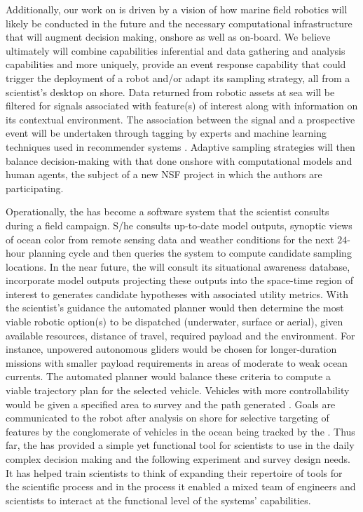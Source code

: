 Additionally, our work on \od is driven by a vision of how marine
field robotics will likely be conducted in the future and the
necessary computational infrastructure that will augment decision
making, onshore as well as on-board. We believe ultimately \od will
combine capabilities inferential and data gathering and analysis
capabilities and more uniquely, provide an event response capability
that could trigger the deployment of a robot and/or adapt its sampling
strategy, all from a scientist's desktop on shore. Data returned from
robotic assets at sea will be filtered for signals associated with
feature(s) of interest along with information on its contextual
environment. The association between the signal and a prospective
event will be undertaken through tagging by experts and machine
learning techniques used in recommender systems
\cite{Adomavicius05}. Adaptive sampling strategies will then balance
decision-making \situ with that done onshore with computational models
and human agents, the subject of a new NSF project in which the
authors are participating.


Operationally, the \od has become a software system that the
scientist consults during a \can field campaign. S/he consults
up-to-date model outputs, synoptic views of ocean color from remote
sensing data and weather conditions for the next $24$-hour planning
cycle and then queries the system to compute candidate sampling
locations. In the near future, the \od will consult its situational
awareness database, incorporate model outputs projecting these outputs
into the space-time region of interest to generates candidate
hypotheses with associated utility metrics. With the scientist's
guidance the automated planner would then determine the most viable
robotic option(s) to be dispatched (underwater, surface or aerial),
given available resources, distance of travel, required payload and
the environment. For instance, unpowered autonomous gliders would be
chosen for longer-duration missions with smaller payload requirements
in areas of moderate to weak ocean currents. The automated planner
would balance these criteria to compute a viable trajectory plan for
the selected vehicle. Vehicles with more controllability would be
given a specified area to survey and the path generated \situ. Goals
are communicated to the robot after analysis on shore for selective
targeting of features by the conglomerate of vehicles in the ocean
being tracked by the \od. Thus far, the \od has provided a simple
yet functional tool for scientists to use in the daily complex
decision making and the following experiment and survey design
needs. It has helped train scientists to think of expanding their
repertoire of tools for the scientific process and in the process it
enabled a mixed team of engineers and scientists to interact at the
functional level of the systems' capabilities.
